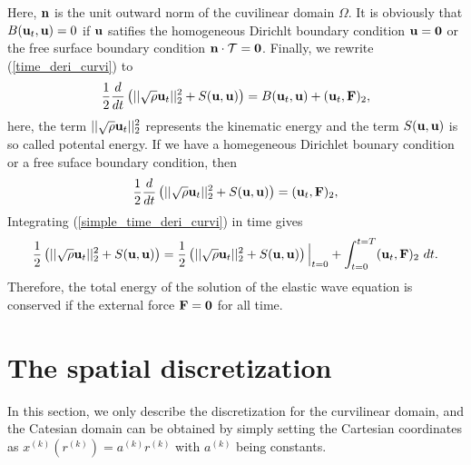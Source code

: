 \documentclass[a4paper]{article}
\begin{document}
Here, ${\bf n}$ is the unit outward norm of the cuvilinear domain $\Omega$. It is obviously that $B({\bf u}_t, {\bf u}) = 0$ if ${\bf u}$ satifies the homogeneous Dirichlt boundary condition ${\bf u} = {\bf 0}$ or the free surface boundary condition ${\bf n}\cdot\mathcal{T} = {\bf 0}$. Finally, we rewrite (\ref{time_deri_curvi}) to
\begin{equation*}
\frac{1}{2}\frac{d}{dt} \left(||\sqrt{\rho}{\bf u}_t||_2^2 + S({\bf u},{\bf u})\right) = B({\bf u}_t,{\bf u}) + ({\bf u}_t,{\bf F})_2,
\end{equation*}
here, the term $||\sqrt{\rho}{\bf u}_t||_2^2$ represents the kinematic energy and the term $S({\bf u},{\bf u})$ is so called potental energy. If we have a homegeneous Dirichlet bounary condition or a free suface boundary condition, then
\begin{equation}\label{simple_time_deri_curvi}
\frac{1}{2}\frac{d}{dt} \left(||\sqrt{\rho}{\bf u}_t||_2^2 + S({\bf u},{\bf u})\right) =  ({\bf u}_t,{\bf F})_2,
\end{equation}
Integrating (\ref{simple_time_deri_curvi}) in time gives
\begin{equation*}
\frac{1}{2}\left(||\sqrt{\rho}{\bf u}_t||_2^2 + S({\bf u},{\bf u})\right)  = \frac{1}{2}\left(||\sqrt{\rho}{\bf u}_t||_2^2 + S({\bf u},{\bf u})\right)\Big|_{t = 0} + \int_{t = 0}^{t = T} ({\bf u}_t,{\bf F})_2 \ dt.
\end{equation*}
Therefore, the total energy of the solution of the elastic wave equation is conserved if the external force ${\bf F} = {\bf 0}$ for all time.


\section{The spatial discretization}

In this section, we only describe the discretization for the curvilinear domain, and the Catesian domain can be obtained by simply setting the Cartesian coordinates as $x^{(k)}(r^{(k)}) = a^{(k)}r^{(k)} $ with $a^{(k)}$ being constants.
\end{document}
